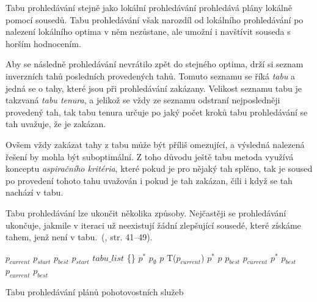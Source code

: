 Tabu prohledávání stejně jako lokální prohledávání prohledává plány lokálně pomocí sousedů.
Tabu prohledávání však narozdíl od lokálního prohledávání po nalezení lokálního optima v něm nezůstane,
ale umožní i navštívit souseda s horším hodnocením.

Aby se následně prohledávání nevrátilo zpět do stejného optima,
drží si seznam inverzních tahů posledních provedených tahů. Tomuto seznamu se říká \textit{tabu} a jedná se o tahy, které 
jsou při prohledávání zakázany.
Velikost seznamu tabu je takzvaná \textit{tabu tenura}, a jelikož se vždy ze seznamu odstraní nejposledněji provedený tah,
tak tabu tenura určuje po jaký počet kroků tabu prohledávání se tah uvažuje, že je zakázan. 

Ovšem vždy zakázat tahy z tabu může být příliš omezující, a výsledná nalezená řešení by mohla být suboptimální.
Z toho důvodu ještě tabu metoda využívá konceptu \textit{aspiračního kritéria}, které pokud je pro nějaký tah splěno,
tak je soused po provedení tohoto tahu uvažován i pokud je tah zakázan, čili i když se tah nachází v tabu.

Tabu prohledávání lze ukončit několika způsoby. Nejčastěji se prohledávání ukončuje, jakmile v iteraci už neexistují žádní zlepšující sousedé,
které získáme tahem, jenž není v tabu.~(\citet{GlovKoch03}, str. 41--49). 

\begin{algorithm}[H]
  \begin{algorithmic}[1]
    \State $p_{current}$ \gets $p_{start}$
    \State $p_{best}$ \gets $p_{start}$
    \State $tabu\_list$ \gets \{\}
      \State $p^*$ \gets $p_{\emptyset}$ 
        \State $p$ \gets T($p_{current}$)
          \State $p^*$ \gets $p$
        \EndIf
      \EndFor
        \State \Return $p_{best}$
      \EndIf
      \State $p_{current}$ \gets $p^*$
        \State $p_{best}$ \gets $p_{current}$
      \EndIf
      \State {}
        \State {} 
      \EndIf
    \EndWhile
    \State \Return $p_{best}$
  \EndFunction
  \end{algorithmic}
  \caption{Tabu prohledávání plánů pohotovostních služeb}
  \label{alg:tabusearch}
\end{algorithm}


